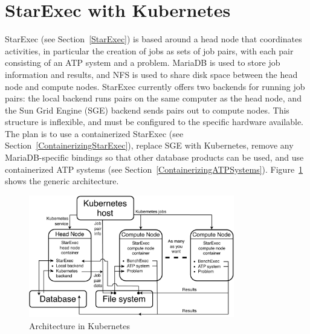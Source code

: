 \documentclass{easychair}
\begin{document}
\section{StarExec with Kubernetes}
\label{StarExecK}

StarExec (see Section~\ref{StarExec}) is based around a head node that coordinates activities, 
in particular the creation of jobs as sets of job pairs, with each pair consisting of an ATP 
system and a problem. 
MariaDB is used to store job information and results, and NFS is used to share disk space between 
the head node and compute nodes. 
StarExec currently offers two backends for running job pairs: the local backend runs pairs on 
the same computer as the head node, and the Sun Grid Engine (SGE) backend sends pairs out to 
compute nodes. 
This structure is inflexible, and must be configured to the specific hardware available. 
The plan is to use a containerized StarExec (see Section~\ref{ContainerizingStarExec}), replace 
SGE with Kubernetes, remove any MariaDB-specific bindings so that other database products can be 
used, and use containerized ATP systems (see Section~\ref{ContainerizingATPSystems}).
Figure~\ref{ArchitectureK} shows the generic architecture.

\begin{figure}[htb]
\begin{center}
\includegraphics[width=0.8\textwidth]{ArchitectureK}
\caption{Architecture in Kubernetes}
\label{ArchitectureK}
\end{center}
\end{figure}
\end{document}
